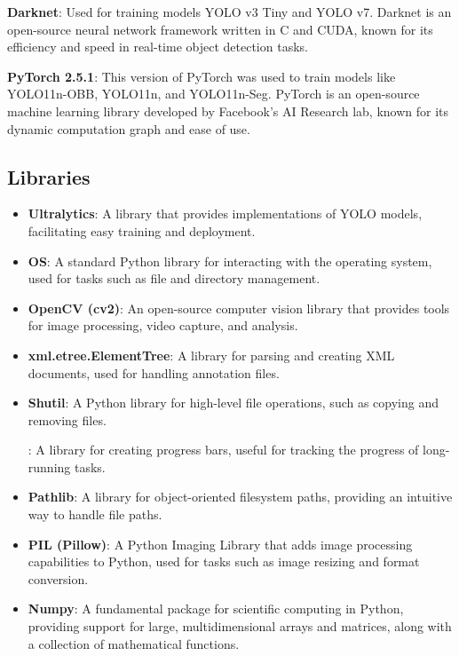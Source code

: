 
\textbf{Darknet}: Used for training models YOLO v3 Tiny and YOLO v7. Darknet is an open-source neural network framework written in C and CUDA, known for its efficiency and speed in real-time object detection tasks.

\noindent\textbf{PyTorch 2.5.1}: This version of PyTorch was used to train models like YOLO11n-OBB, YOLO11n, and YOLO11n-Seg. PyTorch is an open-source machine learning library developed by Facebook's AI Research lab, known for its dynamic computation graph and ease of use.

\subsection{Libraries}

\begin{itemize}
    \item \textbf{Ultralytics}: A library that provides implementations of YOLO models, facilitating easy training and deployment.

\item\textbf{OS}: A standard Python library for interacting with the operating system, used for tasks such as file and directory management.

\item\textbf{OpenCV (cv2)}: An open-source computer vision library that provides tools for image processing, video capture, and analysis.

\item\textbf{xml.etree.ElementTree}: A library for parsing and creating XML documents, used for handling annotation files.

\item\textbf{Shutil}: A Python library for high-level file operations, such as copying and removing files.

: A library for creating progress bars, useful for tracking the progress of long-running tasks.

\item\textbf{Pathlib}: A library for object-oriented filesystem paths, providing an intuitive way to handle file paths.

\item\textbf{PIL (Pillow)}: A Python Imaging Library that adds image processing capabilities to Python, used for tasks such as image resizing and format conversion.

\item\textbf{Numpy}: A fundamental package for scientific computing in Python, providing support for large, multidimensional arrays and matrices, along with a collection of mathematical functions.

\end{itemize}

